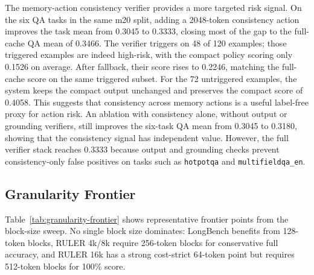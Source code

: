 \documentclass{article}
\begin{document}
The memory-action consistency verifier provides a more targeted risk signal.
On the six QA tasks in the same m20 split, adding a 2048-token consistency action improves the task mean from 0.3045 to 0.3333, closing most of the gap to the full-cache QA mean of 0.3466.
The verifier triggers on 48 of 120 examples; those triggered examples are indeed high-risk, with the compact policy scoring only 0.1526 on average.
After fallback, their score rises to 0.2246, matching the full-cache score on the same triggered subset.
For the 72 untriggered examples, the system keeps the compact output unchanged and preserves the compact score of 0.4058.
This suggests that consistency across memory actions is a useful label-free proxy for action risk.
An ablation with consistency alone, without output or grounding verifiers, still improves the six-task QA mean from 0.3045 to 0.3180, showing that the consistency signal has independent value.
However, the full verifier stack reaches 0.3333 because output and grounding checks prevent consistency-only false positives on tasks such as \texttt{hotpotqa} and \texttt{multifieldqa\_en}.

\subsection{Granularity Frontier}

Table~\ref{tab:granularity-frontier} shows representative frontier points from the block-size sweep.
No single block size dominates:
LongBench benefits from 128-token blocks, RULER 4k/8k require 256-token blocks for conservative full accuracy, and RULER 16k has a strong cost-strict 64-token point but requires 512-token blocks for 100\% score.

\begin{table}[t]
\centering
\caption{Block-size/top-$k$ frontier. Attention upper is approximated as inverse active token ratio.}
\label{tab:granularity-frontier}
\end{table}
\end{document}
